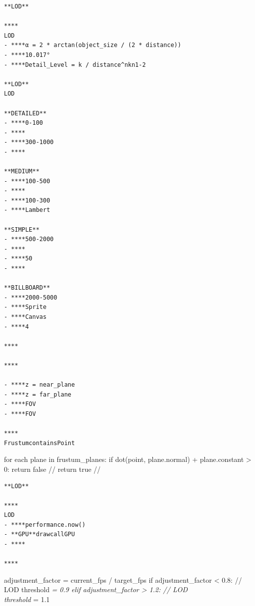 \begin{verbatim}
**LOD**

****
LOD
- ****α = 2 * arctan(object_size / (2 * distance))
- ****10.017°
- ****Detail_Level = k / distance^nkn1-2

**LOD**
LOD

**DETAILED**
- ****0-100
- ****
- ****300-1000
- ****

**MEDIUM**
- ****100-500
- ****
- ****100-300
- ****Lambert

**SIMPLE**
- ****500-2000  
- ****
- ****50
- ****

**BILLBOARD**
- ****2000-5000
- ****Sprite
- ****Canvas
- ****4

****

****

- ****z = near_plane
- ****z = far_plane  
- ****FOV
- ****FOV

****
FrustumcontainsPoint
\end{verbatim}

for each plane in frustum\_planes: if dot(point, plane.normal) +
plane.constant \textgreater{} 0: return false // return true //

\begin{verbatim}
**LOD**

****
LOD
- ****performance.now()
- **GPU**drawcallGPU
- ****

****
\end{verbatim}

adjustment\_factor = current\_fps / target\_fps if adjustment\_factor
\textless{} 0.8: // LOD threshold \emph{= 0.9 elif adjustment\_factor
\textgreater{} 1.2: // LOD\\
threshold }= 1.1

